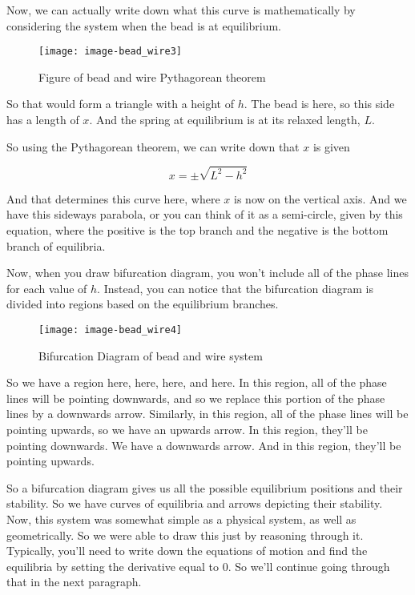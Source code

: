 Now, we can actually write down what
this curve is mathematically by considering the system when the bead is at equilibrium.

\begin{wrapfigure}{r}{4cm}
  \texttt{[image: image-bead\_wire3]}
  \caption{Figure of bead and wire Pythagorean theorem}
\end{wrapfigure}

So that would form a triangle with a height of $h$.
The bead is here, so this side has a length of $x$.
And the spring at equilibrium is at its relaxed length, $L$.

So using the Pythagorean theorem, we can write down that $x$ is given

\begin{equation*}
  x = \pm \sqrt{L^2 - h^2 }
\end{equation*}

And that determines this curve here, where $x$ is now on the vertical axis.
And we have this sideways parabola, or you can think of it as a semi-circle,
given by this equation, where the positive is the top branch
and the negative is the bottom branch of equilibria.

\clearpage

Now, when you draw bifurcation diagram,
you won't include all of the phase lines for each value of $h$.
Instead, you can notice that the bifurcation diagram
is divided into regions based on the equilibrium branches.

\begin{figure}[ht!]
  \centering
  \texttt{[image: image-bead\_wire4]}
  \caption{Bifurcation Diagram of bead and wire system}
\end{figure}

So we have a region here, here, here, and here.
In this region, all of the phase lines will be pointing downwards,
and so we replace this portion of the phase lines by a downwards arrow.
Similarly, in this region, all of the phase lines will be pointing upwards,
so we have an upwards arrow.
In this region, they'll be pointing downwards.
We have a downwards arrow.
And in this region, they'll be pointing upwards.

So a bifurcation diagram gives us all the possible equilibrium positions and their stability.
So we have curves of equilibria and arrows depicting their stability.
Now, this system was somewhat simple as a physical system, as well as geometrically.
So we were able to draw this just by reasoning through it.
Typically, you'll need to write down the equations of motion
and find the equilibria by setting the derivative equal to $0$.
So we'll continue going through that in the next paragraph.

